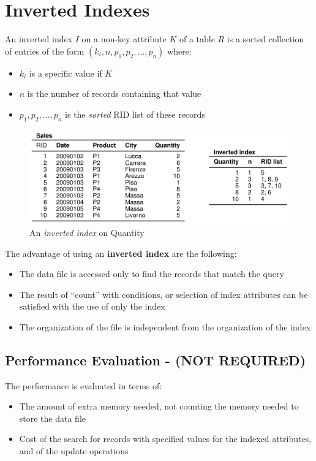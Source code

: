 \section{Inverted Indexes}
\begin{tcolorbox}
An inverted index \(I\) on a non-key attribute \(K\) of a table \(R\) is a sorted collection of entries of the form \((k_i,n,p_1,p_2,...,p_n)\) where:
\begin{itemize}
    \item \(k_i\) is a specific value if \(K\)
    \item \(n\) is the number of records containing that value
    \item \(p_1,p_2,...,p_n\) is the \textit{sorted} RID list of these records
\end{itemize}
\end{tcolorbox}

\begin{figure}[!h]
    \centering
    \includegraphics[width=0.7\linewidth]{images/DBMS_Internals/NonKeyAttributeOrganizations/inverted_index.jpeg}
    \caption{An \textit{inverted index} on Quantity}
\end{figure}

The advantage of using an \textbf{inverted index} are the following:
\begin{itemize}
    \item The data file is accessed only to find the records that match the query
    \item The result of “count” with conditions, or selection of index attributes can be satisfied with the use of only the index
    \item The organization of the file is independent from the organization of the index
\end{itemize}

\subsection{Performance Evaluation - (NOT REQUIRED)}
The performance is evaluated in terms of:
\begin{itemize}
    \item The amount of extra memory needed, not counting the memory needed to store the data file
    \item Cost of the search for records with specified values for the indexed attributes, and of the update operations
\end{itemize}

